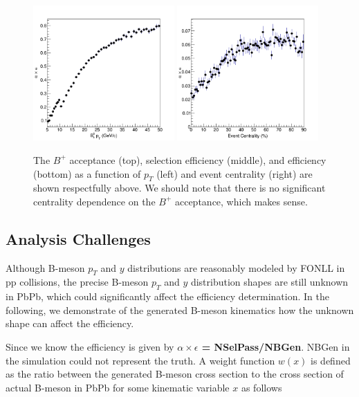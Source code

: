 \begin{figure}[h]
\begin{center}
\includegraphics[width=0.48\textwidth]{Figures/Chapter5/BPEff1DPtHis.png}
\includegraphics[width=0.48\textwidth]{Figures/Chapter5/BPEff1DCentHis.png}
\caption{The $B^+$ acceptance (top), selection efficiency (middle), and efficiency (bottom) as a function of $p_T$ (left) and event centrality (right) are shown respectfully above. We should note that there is no significant centrality dependence on the $B^+$ acceptance, which makes sense.}
\label{BPMCData}
\end{center}
\end{figure}


\subsection{Analysis Challenges}

Although B-meson $p_T$ and $y$ distributions are reasonably modeled by FONLL in pp collisions, the precise B-meson $p_T$ and $y$ distribution shapes are still unknown in PbPb, which could significantly affect the efficiency determination. In the following, we demonstrate of the generated B-meson kinematics how the unknown shape can affect the efficiency. 

Since we know the efficiency is given by \textbf{$\alpha \times \epsilon$ = NSelPass/NBGen}. NBGen in the simulation could not represent the truth. A weight function $w(x)$ is defined as the ratio between the generated B-meson cross section to the cross section of actual B-meson in PbPb for some kinematic variable $x$ as follows

